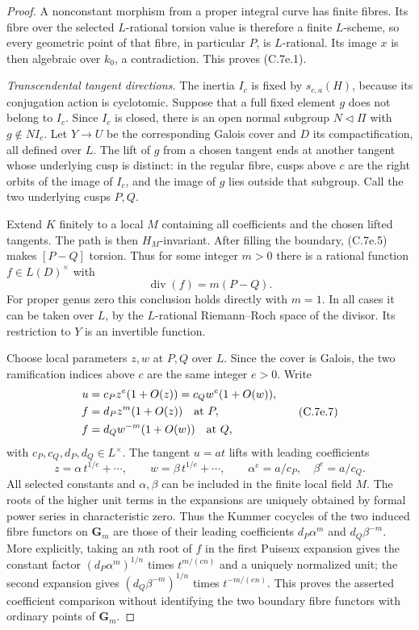 \begin{proof}
A nonconstant morphism from a proper integral curve has finite
fibres. Its fibre over the selected $L$-rational torsion value
is therefore a finite $L$-scheme, so every geometric point
of that fibre, in particular $P$, is $L$-rational. Its image
$x$ is then algebraic over $k_0$, a contradiction. This
proves (C.7e.1).

\emph{Transcendental tangent directions.}
The inertia $I_c$ is fixed by $s_{c,a}(H)$, because its
conjugation action is cyclotomic. Suppose that a full fixed
element $g$ does not belong to $I_c$. Since $I_c$ is closed,
there is an open normal subgroup $N\triangleleft\Pi$ with
$g\notin N I_c$. Let $Y\to U$ be the corresponding Galois
cover and $D$ its compactification, all defined over $L$.
The lift of $g$ from a chosen tangent ends at another tangent
whose underlying cusp is distinct: in the regular fibre,
cusps above $c$ are the right orbits of the image of $I_c$,
and the image of $g$ lies outside that subgroup.
Call the two underlying cusps $P,Q$.

Extend $K$ finitely to a local $M$ containing all coefficients
and the chosen lifted tangents. The path is then $H_M$-invariant.
After filling the boundary, (C.7e.5) makes $[P-Q]$ torsion.
Thus for some integer $m>0$ there is a rational function
$f\in L(D)^\times$ with
\[
                           \operatorname{div}(f)=m(P-Q).
                                                               \tag{C.7e.6}
\]
For proper genus zero this conclusion holds directly with $m=1$.
In all cases it can be taken over $L$, by the $L$-rational
Riemann--Roch space of the divisor. Its restriction to $Y$
is an invertible function.

Choose local parameters $z,w$ at $P,Q$ over $L$. Since the
cover is Galois, the two ramification indices above $c$ are
the same integer $e>0$. Write
\[
 \begin{split}
       u&=c_P z^e(1+O(z))=c_Q w^e(1+O(w)),\\
       f&=d_P z^m(1+O(z))\quad\hbox{at }P,\\
       f&=d_Q w^{-m}(1+O(w))\quad\hbox{at }Q,
 \end{split}                                                  \tag{C.7e.7}
\]
with $c_P,c_Q,d_P,d_Q\in L^\times$.
The tangent $u=a t$ lifts with leading coefficients
\[
          z=\alpha\,t^{1/e}+\cdots,\qquad
          w=\beta\,t^{1/e}+\cdots,\qquad
          \alpha^e=a/c_P,\quad \beta^e=a/c_Q.                 \tag{C.7e.8}
\]
All selected constants and $\alpha,\beta$ can be included
in the finite local field $M$. The roots of the higher
unit terms in the expansions are uniquely obtained by
formal power series in characteristic zero. Thus the
Kummer cocycles of the two induced fibre functors on
$\mathbf G_m$ are those of their leading coefficients
$d_P\alpha^m$ and $d_Q\beta^{-m}$. More explicitly, taking
an $n$th root of $f$ in the first Puiseux expansion gives
the constant factor $(d_P\alpha^m)^{1/n}$ times
$t^{m/(en)}$ and a uniquely normalized unit; the second
expansion gives $(d_Q\beta^{-m})^{1/n}$ times
$t^{-m/(en)}$. This proves the asserted coefficient
comparison without identifying the two boundary fibre
functors with ordinary points of $\mathbf G_m$.


\end{proof}
